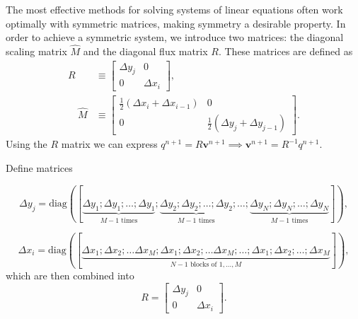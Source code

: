 \documentclass{article}
\begin{document}
The most effective methods for solving systems of linear equations often work optimally with symmetric matrices, making symmetry a desirable property. In order to achieve a symmetric system, we introduce two matrices: the diagonal scaling matrix $\hat{M}$ and the diagonal flux matrix $R$. These matrices are defined as
\begin{align*}
R &\equiv\left[\begin{array}{cc}
\Delta y_j & 0 \\
0 & \Delta x_i
\end{array}\right], \\
\quad \hat{M} & \equiv\left[\begin{array}{cc}
\frac{1}{2}\left(\Delta x_i+\Delta x_{i-1}\right) & 0 \\
0 & \frac{1}{2}\left(\Delta y_j+\Delta y_{j-1}\right)
\end{array}\right].
\end{align*}
Using the $R$ matrix we can express $q^{n+1}=R\boldsymbol{v}^{n+1}\implies \boldsymbol{v}^{n+1}=R^{-1}q^{n+1}$. %

Define matrices 

$$\Delta y_j=\text{diag}([\underbrace{\Delta y_1; \Delta y_1; \dotsc;\Delta y_1}_{M-1\text{ times}}; \underbrace{\Delta y_2; \Delta y_2; \dotsc;\Delta y_2}_{M-1\text{ times}};\dotsc;\underbrace{\Delta y_N; \Delta y_N; \dotsc;\Delta y_N}_{M-1\text{ times}}]),$$

$$ \Delta x_i=\text{diag}([\underbrace{\Delta x_1; \Delta x_2;\dotsc\Delta x_M;\Delta x_1; \Delta x_2;\dotsc\Delta x_M; \dotsc;\Delta x_1; \Delta x_2;\dotsc;\Delta x_M}_{N-1\text{ blocks of } 1,\dotsc,M}]),$$
which are then combined into
\begin{equation*}
R =\left[\begin{array}{cc}
\Delta y_j & 0 \\
0 & \Delta x_i
\end{array}\right].
\end{equation*}
\end{document}
